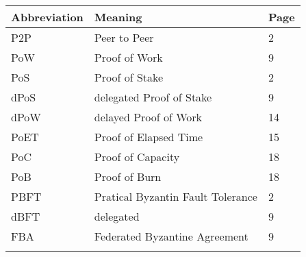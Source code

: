 \documentclass[doublespacing]{bmcart}
\begin{document}
\begin{CJK*}{UTF8}{gbsn}
\begin{tabular}{lll}
\hline
Abbreviation & Meaning  & Page  \\ \hline
P2P & Peer to Peer & 2 \\ 
PoW & Proof of Work & 9 \\ 
PoS & Proof of Stake & 2 \\ 
dPoS & delegated Proof of Stake & 9 \\ 
dPoW & delayed Proof of Work & 14 \\ 
PoET & Proof of Elapsed Time  & 15 \\ 
PoC & Proof of Capacity & 18 \\ 
PoB & Proof of Burn & 18 \\ 
PBFT & Pratical Byzantin Fault Tolerance & 2 \\ 
dBFT & delegated  & 9 \\ 
FBA & Federated Byzantine Agreement & 9 \\ 
 &  &  \\  
\end{tabular}


\end{CJK*}
\end{document}
